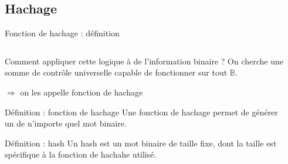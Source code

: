 \subsection{Hachage}

\begin{frame}{Fonction de hachage : définition}
  \begin{columns}
    \begin{column}{0.7\textwidth}
      Comment appliquer cette logique à de l'information binaire ?
      On cherche une somme de contrôle universelle capable de fonctionner sur tout $\mathbb{B}$.

      $\Rightarrow$ on les appelle fonction de hachage

      \begin{block}{Définition : fonction de hachage}
        Une fonction de hachage permet de générer un  de n'importe quel mot binaire.
      \end{block}

      \begin{block}{Définition : hash}
        Un hash est un mot binaire de taille fixe, dont la taille est spécifique à la fonction de hachahe utilisé.
      \end{block}
    \end{column}
    \begin{column}{0.2\textwidth}
    \end{column}
  \end{columns}
\end{frame}

